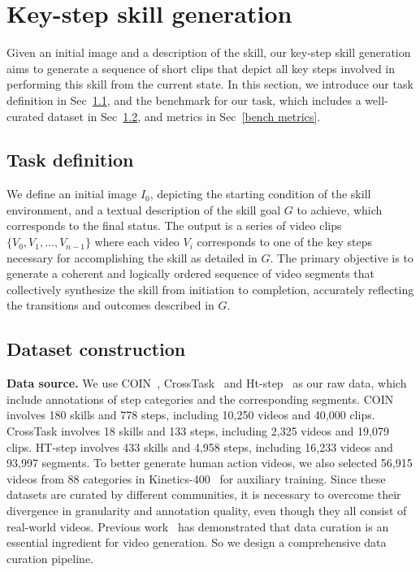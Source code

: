 \section{Key-step skill generation}
Given an initial image and a description of the skill, our key-step skill generation aims to generate a sequence of short clips that depict all key steps involved in performing this skill from the current state. In this section, we introduce our task definition in Sec~\ref{task definition}, and the benchmark for our task, which includes a well-curated dataset in Sec~\ref{bench dataset}, and metrics in Sec~\ref{bench metrics}.

\subsection{Task definition}
\label{task definition}
We define an initial image $I_0$, depicting the starting condition of the skill environment, and a textual description of the skill goal $G$ to achieve, which corresponds to the final status. The output is a series of video clips $\{V_0, V_1,...,V_{n-1}\}$ where each video $V_i$ corresponds to one of the key steps necessary for accomplishing the skill as detailed in $G$. The primary objective is to generate a coherent and logically ordered sequence of video segments that collectively synthesize the skill from initiation to completion, accurately reflecting the transitions and outcomes described in $G$. 

\subsection{Dataset construction}
\label{bench dataset}

\textbf{Data source.} We use COIN~\cite{COIN}, CrossTask~\cite{crosstask} and Ht-step~\cite{htstep} as our raw data, which include annotations of step categories and the corresponding segments. COIN involves 180 skills and 778 steps, including 10,250 videos and 40,000 clips. CrossTask involves 18 skills and 133 steps, including 2,325 videos and 19,079 clips. HT-step involves 433 skills and 4,958 steps, including 16,233 videos and 93,997 segments. To better generate human action videos, we also selected 56,915 videos from 88 categories in Kinetics-400~\cite{k400} for auxiliary training. Since these datasets are curated by different communities, it is necessary to overcome their divergence in granularity and annotation quality, even though they all consist of real-world videos. Previous work~\cite{SVD} has demonstrated that data curation is an essential ingredient for video generation. So we design a comprehensive data curation pipeline.

